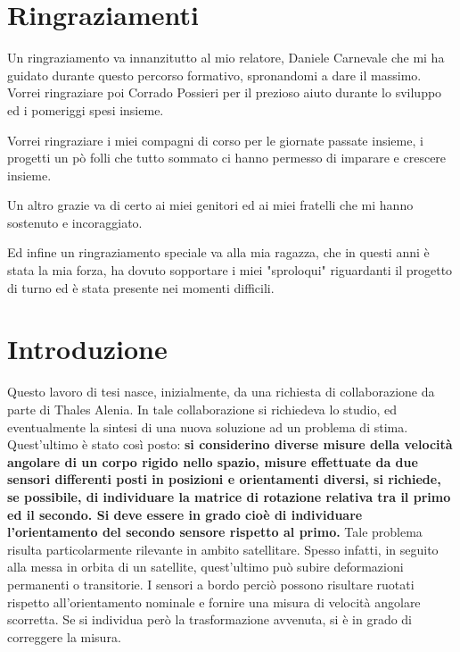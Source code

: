 \chapter*{Ringraziamenti}
Un ringraziamento va innanzitutto al mio relatore, Daniele Carnevale che mi ha guidato durante questo percorso formativo, spronandomi a dare il massimo.
Vorrei ringraziare poi Corrado Possieri per il prezioso aiuto durante lo sviluppo ed i pomeriggi spesi insieme. 
\newline

Vorrei ringraziare i miei compagni di corso per le giornate passate insieme, i progetti un pò folli che tutto sommato ci hanno permesso di imparare e crescere insieme.
\newline

Un altro grazie va di certo ai miei genitori ed ai miei fratelli che mi hanno sostenuto e incoraggiato. 
\newline

Ed infine un ringraziamento speciale va alla mia ragazza, che in questi anni è
stata la mia forza, ha dovuto sopportare i miei "sproloqui" riguardanti il progetto di turno ed è stata presente nei momenti difficili. 


\chapter*{Introduzione}

Questo lavoro di tesi nasce, inizialmente, da una richiesta di collaborazione da parte di Thales Alenia. In tale collaborazione si richiedeva lo studio, ed eventualmente la sintesi di una nuova soluzione ad un problema di stima. Quest'ultimo è stato così posto: \textbf{si considerino diverse misure della velocità angolare di un corpo rigido nello spazio, misure effettuate da due sensori differenti posti in posizioni e orientamenti diversi, si richiede, se possibile, di individuare la matrice di rotazione relativa tra il primo ed il secondo. Si deve essere in grado cioè di individuare l'orientamento del secondo sensore rispetto al primo.} Tale problema risulta particolarmente rilevante in ambito satellitare. Spesso infatti, in seguito alla messa in orbita di un satellite, quest'ultimo può subire deformazioni permanenti o transitorie. I sensori a bordo perciò possono risultare ruotati rispetto all'orientamento nominale e fornire una misura di velocità angolare scorretta. Se si individua però la trasformazione avvenuta, si è in grado di correggere la misura.

